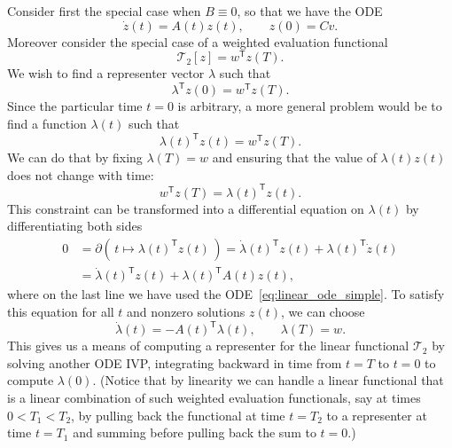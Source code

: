 \documentclass{article}
\begin{document}
Consider first the special case when $B \equiv 0$, so that we have the ODE
\begin{equation}
    \dot z(t) = A(t) z(t), \qquad z(0) = C v.
    \label{eq:linear_ode_simple}
\end{equation}
Moreover consider the special case of a weighted evaluation functional
\begin{equation}
    \mathcal{T}_2[z] = w^\mathsf{T} z(T).
\end{equation}
We wish to find a representer vector $\lambda$ such that
\begin{equation}
\lambda^\mathsf{T} z(0) = w^\mathsf{T} z(T).
\end{equation}
Since the particular time $t=0$ is arbitrary, a more general problem would be
to find a function $\lambda(t)$ such that
\begin{equation}
    \lambda(t)^\mathsf{T} z(t) = w^\mathsf{T} z(T).
\end{equation}
We can do that by fixing $\lambda(T) = w$ and ensuring that the value of
$\lambda(t) z(t)$ does not change with time:
\begin{equation}
     w^\mathsf{T} z(T) = \lambda(t)^\mathsf{T} z(t).
\end{equation}
This constraint can be transformed into a differential equation on $\lambda(t)$
by differentiating both sides
\begin{align}
    0 &= \partial (\, t \mapsto \lambda(t)^\mathsf{T} z(t) \,)
    = \dot \lambda(t)^\mathsf{T} z(t) + \lambda(t)^\mathsf{T} \dot z(t)
    \\
    &= \dot \lambda(t)^\mathsf{T} z(t) + \lambda(t)^\mathsf{T} A(t) z(t),
\end{align}
where on the last line we have used the ODE~\eqref{eq:linear_ode_simple}.
To satisfy this equation for all $t$ and nonzero solutions $z(t)$, we can choose
\begin{equation}
    \dot \lambda(t) = - A(t)^\mathsf{T} \lambda(t), \qquad \lambda(T) = w.
\end{equation}
This gives us a means of computing a representer for the linear functional
$\mathcal{T}_2$ by solving another ODE IVP, integrating backward in time from
$t=T$ to $t=0$ to compute $\lambda(0)$.
(Notice that by linearity we can handle a linear functional that is a linear
combination of such weighted evaluation functionals, say at times $0 < T_1 <
T_2$, by pulling back the functional at time $t=T_2$ to a representer at time
$t=T_1$ and summing before pulling back the sum to $t=0$.)
\end{document}
